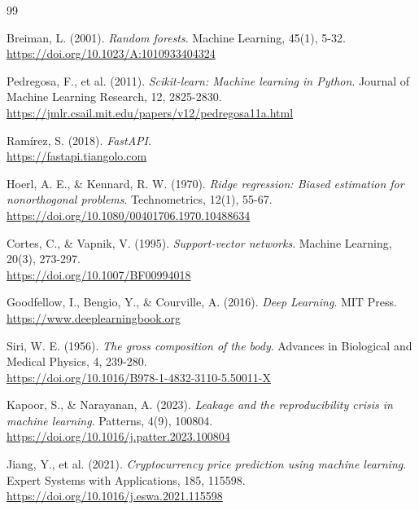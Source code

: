 \documentclass[12pt,letterpaper]{article}
\begin{document}
\newpage
\renewcommand{\refname}{Bibliografía}
\begin{thebibliography}{99}

Breiman, L. (2001). 
\textit{Random forests}. 
Machine Learning, 45(1), 5-32. \\
\url{https://doi.org/10.1023/A:1010933404324}

Pedregosa, F., et al. (2011). 
\textit{Scikit-learn: Machine learning in Python}. 
Journal of Machine Learning Research, 12, 2825-2830. \\
\url{https://jmlr.csail.mit.edu/papers/v12/pedregosa11a.html}

Ramírez, S. (2018). 
\textit{FastAPI}. \\
\url{https://fastapi.tiangolo.com}

Hoerl, A. E., \& Kennard, R. W. (1970). 
\textit{Ridge regression: Biased estimation for nonorthogonal problems}. 
Technometrics, 12(1), 55-67. \\
\url{https://doi.org/10.1080/00401706.1970.10488634}

Cortes, C., \& Vapnik, V. (1995). 
\textit{Support-vector networks}. 
Machine Learning, 20(3), 273-297. \\
\url{https://doi.org/10.1007/BF00994018}

Goodfellow, I., Bengio, Y., \& Courville, A. (2016). 
\textit{Deep Learning}. MIT Press. \\
\url{https://www.deeplearningbook.org}

Siri, W. E. (1956). 
\textit{The gross composition of the body}. 
Advances in Biological and Medical Physics, 4, 239-280. \\
\url{https://doi.org/10.1016/B978-1-4832-3110-5.50011-X}

Kapoor, S., \& Narayanan, A. (2023). 
\textit{Leakage and the reproducibility crisis in machine learning}. 
Patterns, 4(9), 100804. \\
\url{https://doi.org/10.1016/j.patter.2023.100804}

Jiang, Y., et al. (2021). 
\textit{Cryptocurrency price prediction using machine learning}. 
Expert Systems with Applications, 185, 115598. \\
\url{https://doi.org/10.1016/j.eswa.2021.115598}


\end{thebibliography}
\end{document}
